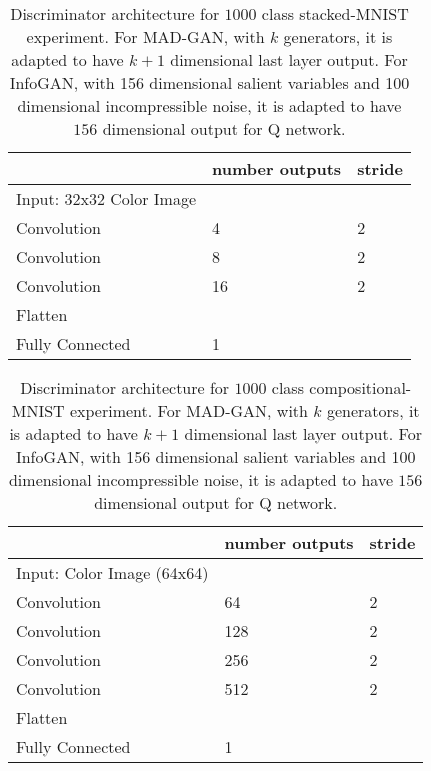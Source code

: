 \begin{center}
	\begin{table}
		\begin{tabular}{| m{12em} | m{4em} | m{4em} | } 
			\hline
			& \textbf{number outputs} & \textbf{stride} \\
			\hline
			Input: 32x32 Color Image  & & \\ 
			\hline
			Convolution & 4 & 2 \\ 
			\hline
			Convolution & 8 & 2 \\
			\hline
			Convolution & 16 & 2 \\
			\hline
			Flatten & & \\
			\hline
			Fully Connected & 1 & \\
			\hline
		\end{tabular}
		\caption{\label{tab:stackMNISTDisc} Discriminator architecture for $1000$ class stacked-MNIST experiment. For MAD-GAN, with $k$ generators, it is adapted to have $k+1$ dimensional last layer output. For InfoGAN, with 156 dimensional salient variables and 100 dimensional incompressible noise, it is adapted to have $156$ dimensional output for Q network. 
		}
	\end{table}
\end{center}

\begin{center}
	\begin{table}
		\begin{tabular}{| m{12em} | m{5em} | m{4em} | } 
			\hline
			& \textbf{number outputs} & \textbf{stride} \\
			\hline
			Input: Color Image (64x64) & & \\ 
			\hline
			Convolution & 64 & 2 \\ 
			\hline
			Convolution & 128 & 2 \\
			\hline
			Convolution & 256 & 2 \\
			\hline
			Convolution & 512 & 2 \\
			\hline
			Flatten & & \\
			\hline
			Fully Connected & 1 & \\
			\hline
		\end{tabular}
		\caption{\label{tab:compositionalMNISTDisc} Discriminator architecture for $1000$ class compositional-MNIST experiment. For MAD-GAN, with $k$ generators, it is adapted to have $k+1$ dimensional last layer output. For InfoGAN, with 156 dimensional salient variables and 100 dimensional incompressible noise, it is adapted to have $156$ dimensional output for Q network.
		}
	\end{table}
\end{center}


